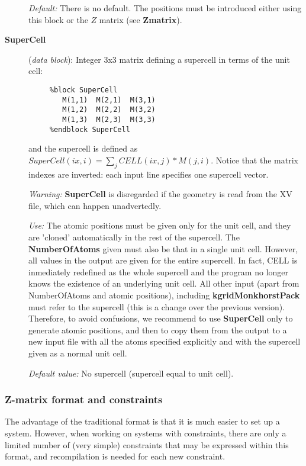 \documentclass[11pt]{article}
\begin{document}
\begin{description}
{\it Default:} There is no default. The positions must be introduced
either using this block or the $Z$ matrix (see {\bf Zmatrix}).


\item[{\bf SuperCell}] ({\it data block}): 
Integer 3x3 matrix defining a supercell in terms of the unit cell: 

\begin{verbatim}
     %block SuperCell
        M(1,1)  M(2,1)  M(3,1) 
        M(1,2)  M(2,2)  M(3,2) 
        M(1,3)  M(2,3)  M(3,3) 
     %endblock SuperCell
\end{verbatim}

and the supercell is defined as
$SuperCell(ix,i) = \sum_j CELL(ix,j)*M(j,i)$.
Notice that the matrix indexes are inverted: each input line 
specifies one supercell vector.

{\it Warning:} {\bf SuperCell} is disregarded if the geometry is read from
the XV file, which can happen unadvertedly.

{\it Use:} The atomic positions must be given only for the unit cell,
and they are 'cloned' automatically in the rest of the supercell.
The {\bf NumberOfAtoms} given must also be that in a single unit cell.
However, all values in the output are given for the entire supercell. 
In fact, CELL is inmediately redefined as the whole supercell and the 
program no longer knows the existence of an underlying unit cell.
All other input (apart from NumberOfAtoms and atomic positions), 
including {\bf kgridMonkhorstPack} must refer to the supercell 
(this is a change over the previous version). Therefore, to avoid
confusions, we recommend to use {\bf SuperCell} only to
generate atomic positions, and then to copy them from the output
to a new input file with all the atoms specified explicitly and
with the supercell given as a normal unit cell.

{\it Default value:} No supercell (supercell equal to unit cell).

\end{description}

\subsubsection{Z-matrix format and constraints}

The advantage of the traditional format is that it is
much easier to set up a system. However, when working
on systems with constraints, there are only a limited
number of (very simple) constraints that may be expressed
within this format, and recompilation is needed for each
new constraint. 
\end{document}
